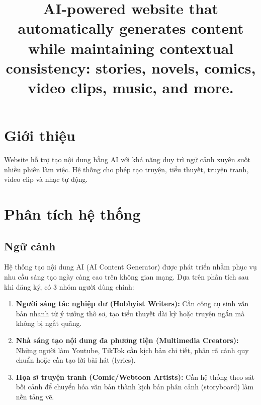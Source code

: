 \documentclass[final]{hcmuitthesis}
\title{AI-powered website that automatically generates content while maintaining contextual consistency: stories, novels, comics, video clips, music, and more.}
\begin{document}
\coverpage

\frontmatter


\tableofcontents
\clearpage
\listoffigures
\clearpage
\listoftables
\clearpage
\lstlistoflistings
\clearpage

\mainthesis

\chapter{Giới thiệu}
Website hỗ trợ tạo nội dung bằng AI với khả năng duy trì ngữ cảnh xuyên suốt nhiều phiên làm việc. 
Hệ thống cho phép tạo truyện, tiểu thuyết, truyện tranh, video clip và nhạc tự động.
\chapter{Phân tích hệ thống}
\section{Ngữ cảnh}
Hệ thống tạo nội dung AI (AI Content Generator) được phát triển nhằm phục vụ nhu cầu sáng tạo ngày càng cao trên không gian mạng. Dựa trên phân tích sau khi đăng ký, có 3 nhóm người dùng chính:
\begin{enumerate}
    \item \textbf{Người sáng tác nghiệp dư (Hobbyist Writers):} Cần công cụ sinh văn bản nhanh từ ý tưởng thô sơ, tạo tiểu thuyết dài kỳ hoặc truyện ngắn mà không bị ngắt quãng.
    \item \textbf{Nhà sáng tạo nội dung đa phương tiện (Multimedia Creators):} Những người làm Youtube, TikTok cần kịch bản chi tiết, phân rã cảnh quy chuẩn hoặc cần tạo lời bài hát (lyrics).
    \item \textbf{Họa sĩ truyện tranh (Comic/Webtoon Artists):} Cần hệ thống theo sát bối cảnh để chuyển hóa văn bản thành kịch bản phân cảnh (storyboard) làm nền tảng vẽ.
\end{enumerate}
\end{document}

